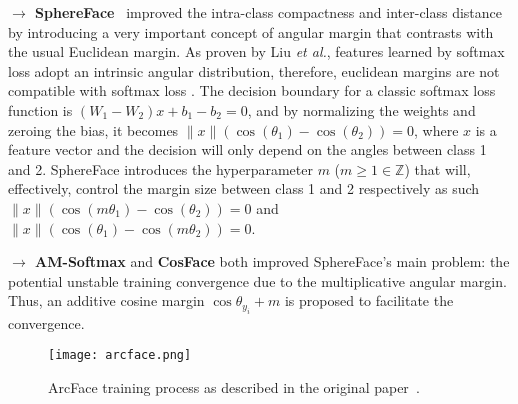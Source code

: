 \documentclass[class=report, crop=false, a4paper, 12pt]{standalone}
\begin{document}
\noindent\textbf{$\rightarrow$ SphereFace}~\autocite{liuSphereFaceDeepHypersphere2018} improved the intra-class compactness and inter-class distance by introducing a very important concept of angular margin that contrasts with the usual Euclidean margin. As proven by Liu \textit{et al.}, features learned by softmax loss adopt an intrinsic angular distribution, therefore, euclidean margins are not compatible with softmax loss . The decision boundary for a classic softmax loss function is $(W_1 - W_2)x+b_1-b_2=0$, and by normalizing the weights and zeroing the bias, it becomes $\|x\|(\cos{(\theta_1)}-\cos{(\theta_2)})=0$, where $x$ is a feature vector and the decision will only depend on the angles between class 1 and 2. SphereFace introduces the hyperparameter $m$ ($m\geq1 \in \mathbb{Z}$) that will, effectively, control the margin size between class 1 and 2 respectively as such $\|x\|(\cos{(m\theta_1)}-\cos{(\theta_2)})=0$ and $\|x\|(\cos{(\theta_1)}-\cos{(m\theta_2)})=0$.


\vspace{0.7\baselineskip}
\noindent\textbf{$\rightarrow$ AM-Softmax} and \textbf{CosFace} both improved SphereFace's main problem: the potential unstable training convergence due to the multiplicative angular margin. Thus, an additive cosine margin $\cos{\theta_{y_i}}+m$ is proposed to facilitate the convergence.

\begin{figure}[H]
    \centering
    \texttt{[image: arcface.png]}
    \caption[ArcFace training process.]{ArcFace training process as described in the original paper~\autocite{dengArcFaceAdditiveAngular}.}
    \label{fig:arcface}
\end{figure}
\end{document}
